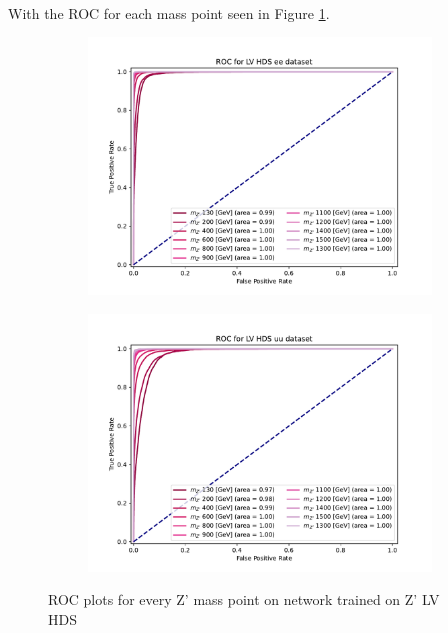 \documentclass[14pt, a4paper]{book}
\begin{document}
\\With the ROC for each mass point seen in Figure \ref{fig:LV_HDS_ROCS}.
\begin{figure}[!ht]
	\centering
	\begin{subfigure}[b]{0.49\textwidth}
      \centering
      \includegraphics[width=1\textwidth]{XGBoost/LV_HDS/ROC_ee.pdf}
      \end{subfigure}
   \hfill
   \begin{subfigure}[b]{0.49\textwidth}
      \centering
      \includegraphics[width=1\textwidth]{XGBoost/LV_HDS/ROC_uu.pdf}
      \end{subfigure}
   \caption{ROC plots for every Z' mass point on network trained on Z' LV HDS}\label{fig:LV_HDS_ROCS}
\end{figure}
\end{document}
